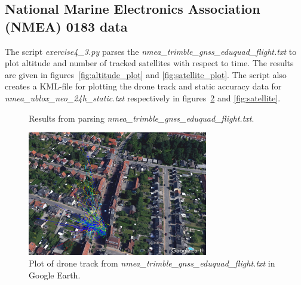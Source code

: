 \documentclass[a4paper,10pt,fleqn]{article}
\begin{document}
\subsection{National Marine Electronics Association (NMEA) 0183 data}
The script \textit{exercise4\_3.py} parses the \textit{nmea\_trimble\_gnss\_eduquad\_flight.txt} to plot altitude and number of tracked satellites with respect to time. The results are given in figures~\ref{fig:altitude_plot} and \ref{fig:satellite_plot}. The script also creates a KML-file for plotting the drone track and static accuracy data for \textit{nmea\_ublox\_neo\_24h\_static.txt} respectively in figures~\ref{fig:drone_track} and \ref{fig:satellite}.

\begin{figure}[]
    \centering 
    \qquad
    \caption[]{Results from parsing \textit{nmea\_trimble\_gnss\_eduquad\_flight.txt}.} 
    \label{fig:id_overall}
\end{figure}

\begin{figure}[]
    \centering 
    \includegraphics[width=0.7\textwidth]{./graphics/drone_track.png}
    \caption[]{Plot of drone track from \textit{nmea\_trimble\_gnss\_eduquad\_flight.txt} in Google Earth.} 
    \label{fig:drone_track}
\end{figure}
\end{document}
